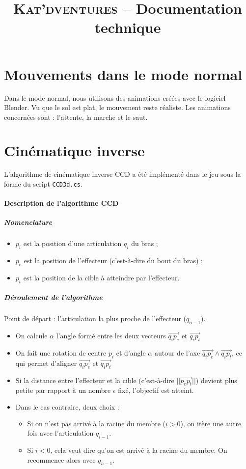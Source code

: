 \documentclass[a4paper,11pt]{article}
\title{ \textsc{Kat'dventures} -- Documentation technique }
\date{}                    %
\begin{document}
          

\maketitle                 %
\thispagestyle{empty}      %

\section{Mouvements dans le mode normal}
Dans le mode normal, nous utilisons des animations créées avec le logiciel Blender. Vu que le sol est plat, le mouvement reste réaliste. Les animations concernées sont : l’attente, la marche et le saut. 

\section{Cinématique inverse}
L'algorithme de cinématique inverse CCD a été implémenté dans le jeu sous la forme du script \texttt{CCD3d.cs}.
\paragraph{Description de l'algorithme CCD} 
\subparagraph{Nomenclature}
\begin{itemize}
\item $p_i$ est la position d'une articulation $q_i$ du bras ;
\item $p_e$ est la position de l'effecteur (c'est-à-dire du bout du bras) ;
\item $p_t$ est la position de la cible à atteindre par l'effecteur. 
\end{itemize} 

\subparagraph{Déroulement de l'algorithme}


\begin{flushleft}
Point de départ : l'articulation la plus proche de l'effecteur ($q_{n-1}$).
\end{flushleft}
\begin{itemize}
\item On calcule $\alpha$ l'angle formé entre les deux vecteurs $\vec{q_i p_e}$ et $\vec{q_i p_t}$
\item On fait une rotation de centre $p_i$ et d'angle $\alpha$ autour de l'axe $\vec{q_i p_e}\land\vec{q_i p_t}$, ce qui permet d'aligner $\vec{q_i p_e}$ et $\vec{q_i p_t}$
\item Si la distance entre l'effecteur et la cible (c'est-à-dire $||\vec{p_e p_t}||$) devient plus petite par rapport à un nombre $\epsilon$ fixé, l'objectif est atteint. 
\item Dans le cas contraire, deux choix : 
\begin{itemize}
\item Si on n'est pas arrivé à la racine du membre ($i>0$), on itère une autre fois avec l'articulation $q_{i-1}$.
\item Si $i<0$, cela veut dire qu'on est arrivé à la racine du membre. On recommence alors avec $q_{n-1}$.
\end{itemize}
\end{itemize}
\end{document}

